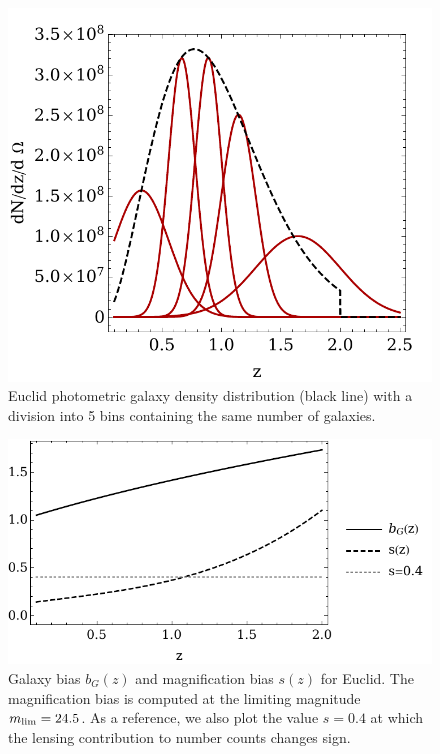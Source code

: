 \begin{figure}[t!]
\vspace{0.3cm}
\begin{center}
\includegraphics[width=.45\textwidth]{figures/chapter-mnu/euclid_5bin.pdf}
\end{center}
\caption{Euclid photometric galaxy density distribution (black line) with a division into 5 bins containing the same number of galaxies.
}
\label{fig:dNdz}
\end{figure}

%
\begin{figure}[t!]
\begin{center}
\includegraphics[width=.45\textwidth]{figures/chapter-mnu/bs.pdf}
\end{center}
\caption{Galaxy bias $b_G(z)$ and magnification bias $s(z)$ for Euclid. The
magnification bias is computed at the limiting magnitude $m_{\rm lim}=24.5$.
As a reference, we also plot the value $s=0.4$ at which the lensing contribution to number counts changes sign.
}
\label{fig:bs}
\end{figure}
%

